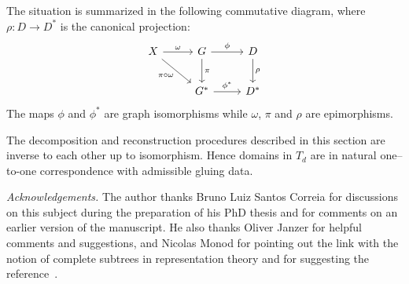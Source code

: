 \documentclass[a4paper, 11pt]{article}
\numberwithin{equation}{section}
\theoremstyle{definition}
\theoremstyle{remark}
\begin{document}
\medskip

The situation is summarized in the following commutative diagram, 
where $\rho : D \to D^*$ is the canonical projection: 
\[
\begin{tikzcd}[row sep=2.2em, column sep=2.5em]
X \arrow[r, "\omega"] \arrow[dr, "\pi\circ\omega"'] &
G \arrow[d, "\pi"] \arrow[r, "\phi"] &
D \arrow[d, "\rho"] \\
& G^* \arrow[r, "\phi^*"] & D^*
\end{tikzcd}
\]
The maps $\phi$ and $\phi^*$ are graph isomorphisms while $\omega$,  $\pi$ and $\rho$ are  epimorphisms.

\medskip 

The decomposition and reconstruction procedures described in this section are inverse to each other up to isomorphism. Hence domains in $T_d$ are in natural one--to-one correspondence with  admissible gluing data.

\bigskip 

\textit{Acknowledgements.} The author thanks Bruno Luiz Santos Correia for discussions on this subject during the preparation of his PhD thesis and for comments on an earlier version of the manuscript. He also thanks Oliver Janzer for helpful comments and suggestions, and Nicolas Monod for pointing out the link with the notion of complete subtrees in representation theory and for suggesting the reference~\cite{Olshanskii1977}.
\end{document}
